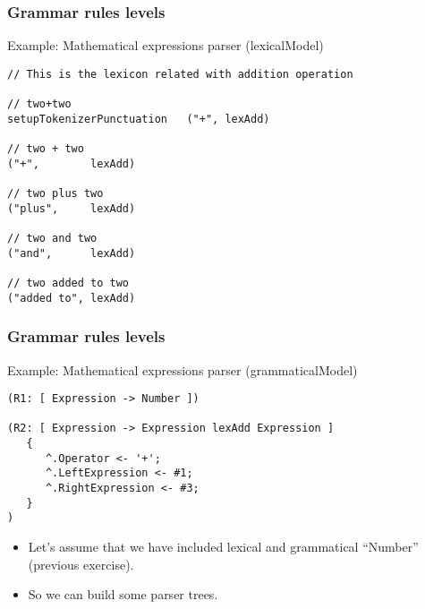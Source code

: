 \documentclass[11pt]{beamer}
\begin{document}
\begin{frame}[fragile]
\frametitle{Grammar rules levels}
\begin{block}{Example: Mathematical expressions parser (lexicalModel)}
\scriptsize
\begin{lstlisting}[language=lekta]
// This is the lexicon related with addition operation

// two+two
setupTokenizerPunctuation   ("+", lexAdd) 

// two + two
("+",        lexAdd)

// two plus two
("plus",     lexAdd)

// two and two
("and",      lexAdd)

// two added to two 
("added to", lexAdd)
\end{lstlisting}
\end{block}
\end{frame}

\begin{frame}[fragile]
\frametitle{Grammar rules levels}
\begin{block}{Example: Mathematical expressions parser (grammaticalModel)}
\scriptsize
\begin{lstlisting}[language=lekta]
(R1: [ Expression -> Number ])

(R2: [ Expression -> Expression lexAdd Expression ]
   { 
      ^.Operator <- '+';
      ^.LeftExpression <- #1;
      ^.RightExpression <- #3; 
   }
)
\end{lstlisting}
\end{block}
\begin{itemize}
	\item Let's assume that we have included lexical and grammatical ``Number'' (previous exercise).
	\item So we can build some parser trees.
\end{itemize}
\end{frame}
\end{document}
